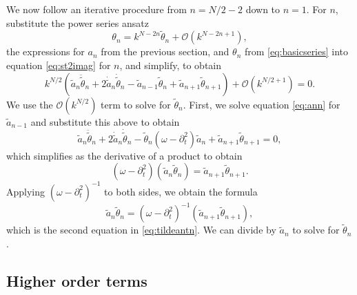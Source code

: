 \documentclass[11pt,reqno]{amsart}
\begin{document}
We now follow an iterative procedure from $n=N/2-2$ down to $n=1$. For $n$, substitute the power series ansatz
\[
\theta_{n} = k^{N-2n} \widetilde{\theta}_{n} + \mathcal{O}(k^{N-2n+1}),
\]
the expressions for $a_n$ from the previous section, and $\theta_n$ from \cref{eq:basicseries} into equation \cref{eq:st2imag} for $n$, and simplify, to obtain
\[
k^{N/2} \left( \widetilde{a}_n \ddot{\widetilde{\theta}}_n + 2 \dot{\widetilde{a}}_n \dot{\widetilde{\theta}}_n
- \widetilde{a}_{n-1} \widetilde{\theta}_n + \widetilde{a}_{n+1}\widetilde{\theta}_{n+1} \right) + \mathcal{O}\left(k^{N/2+1}\right) = 0.
\]
We use the $\mathcal{O}(k^{N/2})$ term to solve for $\widetilde{\theta}_{n}$. First, we solve equation \cref{eq:ann} for $\widetilde{a}_{n-1}$ and substitute this above to obtain
\[
\widetilde{a}_n \ddot{\widetilde{\theta}}_n + 2 \dot{\widetilde{a}}_n \dot{\widetilde{\theta}}_n
- \widetilde{\theta}_n (\omega - \partial_t^2) \widetilde{a}_n + \widetilde{a}_{n+1} \widetilde{\theta}_{n+1} = 0,
\]
which simplifies as the derivative of a product to obtain
\[
(\omega - \partial_t^2)\left( \widetilde{a}_n \widetilde{\theta}_n \right) = \widetilde{a}_{n+1} \widetilde{\theta}_{n+1}.
\]
Applying $(\omega - \partial_t^2)^{-1}$ to both sides, we obtain the formula
\begin{equation}\label{an2th}
\widetilde{a}_n \widetilde{\theta}_n = (\omega - \partial_t^2)^{-1} \left( \widetilde{a}_{n+1} \widetilde{\theta}_{n+1} \right),
\end{equation}
which is the second equation in \cref{eq:tildeantn}. We can divide by $\widetilde{a}_n$ to solve for $\widetilde{\theta}_n$. 

\subsection{Higher order terms}\label{sec:hot}
\end{document}
